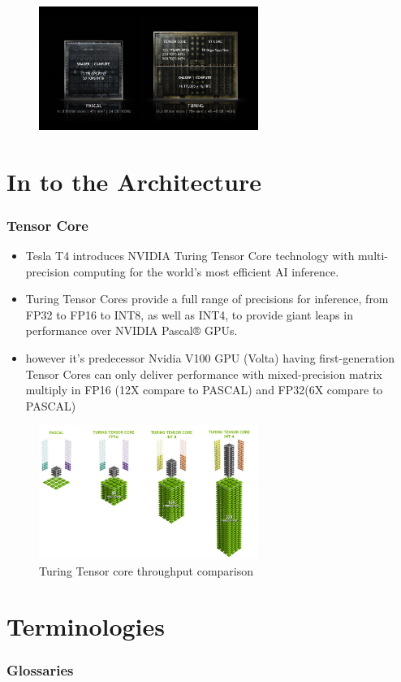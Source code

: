 \documentclass[xcolor=x11names,table]{beamer}
\begin{document}
\begin{frame}
\begin{figure}[H]
\includegraphics[width=270px]{refs/NVIDIA-RTX-Turing-GPU_19-1}
\end{figure}
\end{frame}

\section{In to the Architecture}
    \begin{frame}[allowframebreaks]
    \frametitle{Tensor Core}
        \begin{itemize}
            \item Tesla T4 introduces NVIDIA Turing Tensor Core technology with multi-precision computing for the world’s most efficient AI inference. 
            
            \item Turing Tensor Cores provide a full range of precisions for inference, from FP32 to FP16 to INT8, as well as INT4, to provide giant leaps in performance over NVIDIA Pascal® GPUs.
            
            \item however it's predecessor Nvidia V100 GPU (Volta) having first-generation Tensor Cores can only deliver performance with mixed-precision matrix multiply in FP16 (12X compare to PASCAL) and FP32(6X compare to PASCAL)
        \end{itemize}
        \begin{figure}[H]
        \includegraphics[width=270px]{refs/turing-throughput-tensor.jpg}
        \caption{Turing Tensor core throughput comparison}
        \end{figure}
    \end{frame}

\section{Terminologies}
    \begin{frame}
    \frametitle{Glossaries}
        \printglossaries
    \end{frame}
\end{document}
